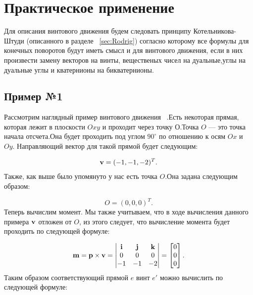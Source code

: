 \section{Практическое применение}

Для описания винтового движения будем следовать принципу Котельникова-Штуди (описанного в разделе ~\ref{sec:Rodrig}) согласно которому все формулы для конечных поворотов будут иметь смысл и для винтового движения,
если в них произвести замену векторов на винты, вещественых чисел на дуальные,углы на дуальные углы и кватернионы на бикватернионы.  

\subsection{Пример №1}
\label{sec:Example}

Рассмотрим наглядный пример винтового движения ~\cite{collection:2025}.Есть некоторая прямая, которая лежит в плоскости $Oxy$ и проходит через точку $О$.Точка $O$ --- это точка начала отсчета.Она будет проходить
под углом $90^\circ$ по отношению к осям $Ox$ и $Oy$. Направляющий вектор для такой прямой будет следующим:

\begin{equation*}
    \vb{v} = ( -1, -1,  -2)^T.
\end{equation*}
Также, как выше было упомянуто у нас есть точка \(O\).Она задана следующим образом:

\begin{equation*}
    O=(0, 0, 0)^T.
\end{equation*}
Теперь вычислим момент. Мы также учитываем, что в ходе вычисления данного примера \(\vb{v}\) отложен от \(O\), из этого следует, что вычисление момента будет проходить по следующей формуле:

\begin{equation*}
    \vb{m} = \vb{p} \times \vb{v} = 
    \begin{vmatrix}
        \vb{i} & \vb{j} & \vb{k} \\
        0 & 0 & 0 \\
        -1 & -1 & -2
    \end{vmatrix}
    =
    \begin{bmatrix}
        0 \\
        0 \\
        0
    \end{bmatrix}.
\end{equation*}
Таким образом соответствующий прямой $e$ винт $e'$ можно вычислить по следующей формуле:

